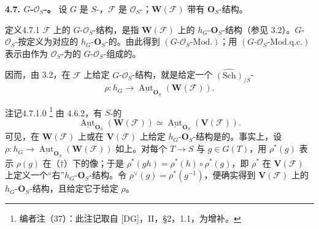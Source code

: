 \textbf{4.7. $G$-$\mathcal O_S$-。} 设 $G$ 是 $S$-，$\mathcal F$ 是 $\mathcal O_S$-；$\mathbf W(\mathcal F)$ 带有 $\mathbf O_S$-结构。
\begin{SGAresult}{定义}{4.7.1}
$\mathcal F$ 上的 $G$-$\mathcal O_S$-结构，是指 $\mathbf W(\mathcal F)$ 上的 $h_G$-$\mathbf O_S$-结构（参见 3.2）。$G$-$\mathcal O_S$-按定义为对应的 $h_G$-$\mathbf O_S$-的。由此得到 $(G\text{-}\mathcal O_S\text{-}\mathrm{Mod.})$；用 $(G\text{-}\mathcal O_S\text{-}\mathrm{Mod.q.c.})$ 表示由作为 $\mathcal O_S$-为的 $G$-$\mathcal O_S$-组成的。
\end{SGAresult}
因而，由 3.2，在 $\mathcal F$ 上给定 $G$-$\mathcal O_S$-结构，就是给定一个 $\widehat{(\mathrm{Sch})}_{/S}$-
\[
\rho:h_G\longrightarrow\underline{\operatorname{Aut}}_{\mathbf O_S}(\mathbf W(\mathcal F)).
\]
\begin{SGAresult}{注记}{4.7.1.0}
\footnote{编者注（37）：此注记取自 [DG]，II，§2，1.1，为增补。} 由 4.6.2，有 $S$-的
\[
\underline{\operatorname{Aut}}_{\mathbf O_S}(\mathbf W(\mathcal F))\simeq\underline{\operatorname{Aut}}_{\mathbf O_S}(\mathbf V(\mathcal F)).\tag{$\dagger$}
\]
可见，在 $\mathbf W(\mathcal F)$ 上或在 $\mathbf V(\mathcal F)$ 上给定 $h_G$-$\mathbf O_S$-结构是的。事实上，设 $\rho:h_G\to\underline{\operatorname{Aut}}_{\mathbf O_S}(\mathbf W(\mathcal F))$ 如上。对每个 $T\to S$ 与 $g\in G(T)$，用 $\rho^*(g)$ 表示 $\rho(g)$ 在（$\dagger$）下的像；于是 $\rho^*(gh)=\rho^*(h)\circ\rho^*(g)$，即 $\rho^*$ 在 $\mathbf V(\mathcal F)$ 上定义一个“右”$h_G$-$\mathbf O_S$-结构。令 $\rho^\vee(g)=\rho^*(g^{-1})$，便确实得到 $\mathbf V(\mathcal F)$ 上的 $h_G$-$\mathbf O_S$-结构，且给定它于给定 $\rho$。
\end{SGAresult}
